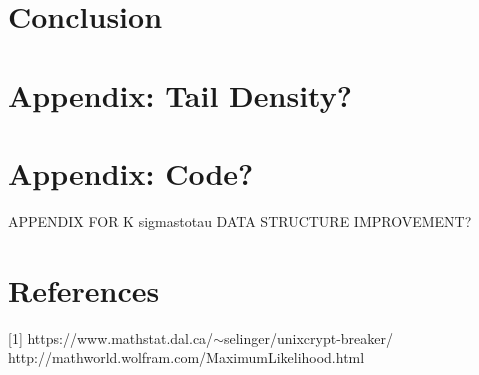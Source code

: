 \documentclass[12pt]{article}
\theoremstyle{definition}
\theoremstyle{remark}
\theoremstyle{remark}
\begin{document}
% 


\section{Conclusion}

\section{Appendix: Tail Density?}
\section{Appendix: Code?}
APPENDIX FOR K sigmastotau DATA STRUCTURE IMPROVEMENT?
\section{References}
[1] https://www.mathstat.dal.ca/$\sim$selinger/unixcrypt-breaker/ \\
\noindent
[2] http://mathworld.wolfram.com/MaximumLikelihood.html
\end{document}
